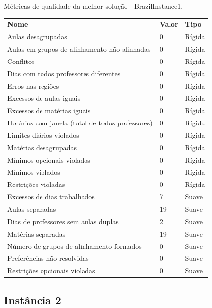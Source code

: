 \begin{quadro}[h]
	\centering
	\caption{Métricas de qualidade da melhor solução - BrazilInstance1.\label{qua:caracteristicas_horario_validacao_brazilinstance1}}
	\begin{tabular}{|p{8cm}|p{1cm}|p{3cm}|}
		\hline
		\textbf{Nome} & \textbf{Valor} & \textbf{Tipo} \\
		Aulas desagrupadas & 0 & Rígida \\
		\hline
		Aulas em grupos de alinhamento não alinhadas & 0 & Rígida \\
		\hline
		Conflitos & 0 & Rígida \\
		\hline
		Dias com todos professores diferentes & 0 & Rígida \\
		\hline
		Erros nas regiões & 0 & Rígida \\
		\hline
		Excessos de aulas iguais & 0 & Rígida \\
		\hline
		Excessos de matérias iguais & 0 & Rígida \\
		\hline
		Horários com janela (total de todos professores) & 0 & Rígida \\
		\hline
		Limites diários violados & 0 & Rígida \\
		\hline
		Matérias desagrupadas & 0 & Rígida \\
		\hline
		Mínimos opcionais violados & 0 & Rígida \\
		\hline
		Mínimos violados & 0 & Rígida \\
		\hline
		Restrições violadas & 0 & Rígida \\
		\hline
		Excessos de dias trabalhados & 7 & Suave \\
		\hline
		Aulas separadas & 19 & Suave \\
		\hline
		Dias de professores sem aulas duplas & 2 & Suave \\
		\hline
		Matérias separadas & 19 & Suave \\
		\hline
		Número de grupos de alinhamento formados & 0 & Suave \\
		\hline
		Preferências não resolvidas & 0 & Suave \\
		\hline
		Restrições opcionais violadas & 0 & Suave \\
		\hline
	\end{tabular}
\end{quadro}

\clearpage
\subsection{Instância 2}

